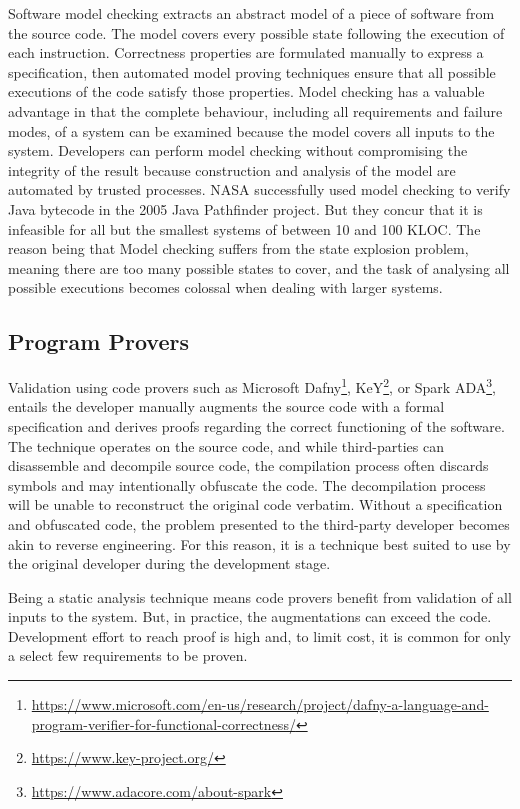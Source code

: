 Software model checking extracts an abstract model of a piece of software from the source code.  The model covers every possible state following the execution of each instruction.  Correctness properties are formulated manually to express a specification, then automated model proving techniques ensure that all possible executions of the code satisfy those properties.  Model checking has a valuable advantage in that the complete behaviour, including all requirements and failure modes, of a system can be examined because the model covers all inputs to the system.  Developers can perform model checking without compromising the integrity of the result because construction and analysis of the model are automated by trusted processes.  NASA successfully used model checking to verify Java bytecode in the 2005 Java Pathfinder \cite{JavaPathfinder} project.  But they concur that it is infeasible for all but the smallest systems of between 10 and 100 KLOC.  The reason being that Model checking suffers from the state explosion problem, meaning there are too many possible states to cover, and the task of analysing all possible executions becomes colossal when dealing with larger systems.

\subsection{Program Provers}
\label{subSec:ProgramProvers}

Validation using code provers such as Microsoft Dafny\footnote{\url{https://www.microsoft.com/en-us/research/project/dafny-a-language-and-program-verifier-for-functional-correctness/}}, KeY\footnote{\url{https://www.key-project.org/}}, or Spark ADA\footnote{\url{https://www.adacore.com/about-spark}}, entails the developer manually augments the source code with a formal specification and derives proofs regarding the correct functioning of the software.  The technique operates on the source code, and while third-parties can disassemble and decompile source code, the compilation process often discards symbols and may intentionally obfuscate the code.  The decompilation process will be unable to reconstruct the original code verbatim.  Without a specification and obfuscated code, the problem presented to the third-party developer becomes akin to reverse engineering.  For this reason, it is a technique best suited to use by the original developer during the development stage.

Being a static analysis technique means code provers benefit from validation of all inputs to the system.  But, in practice, the augmentations can exceed the code.  Development effort to reach proof is high and, to limit cost, it is common for only a select few requirements to be proven.\\

